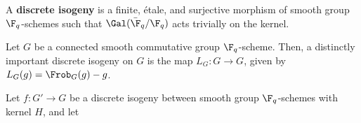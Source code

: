     
                
            \begin{definition} \label{def: discrete_isogenies}
                A \textbf{discrete isogeny} is a finite, \'etale, and surjective morphism of smooth group $\F_q$-schemes such that $\Gal(\bar{\F}_q/\F_q)$ acts trivially on the kernel.
            \end{definition}
            \begin{example} \label{example: the_lang_isogeny}
                Let $G$ be a connected smooth commutative group $\F_q$-scheme. Then, a distinctly important discrete isogeny on $G$ is the map $L_G: G \to G$, given by $L_G(g) = \Frob_G(g) - g$.
            \end{example}
            \begin{proposition}
                \cite[Proposition 1.10]{cunningham_roe_function_sheaf_dictionary_quasi_characters_p_adic_tori} Let $f: G' \to G$ be a discrete isogeny between smooth group $\F_q$-schemes with kernel $H$, and let 
            \end{proposition}         
    